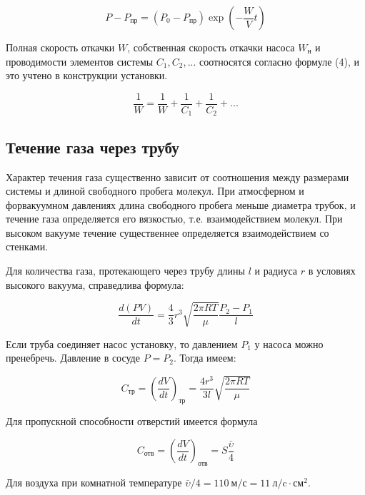\documentclass[a4paper,12pt]{article} %
\begin{document}
 \begin{equation}
 	P - P_{\text{пр}} = (P_0 - P_{\text{пр}})\exp(-\frac{W}{V}t)
 \end{equation}
 
\noindent Полная скорость откачки $W$, собственная скорость откачки насоса $W_{\text{н}}$ и проводимости элементов системы $C_1, C_2,...$ соотносятся согласно формуле (4), и это учтено в конструкции установки.

 \begin{equation}
 \frac{1}{W} = \frac{1}{W} + \frac{1}{C_1} + \frac{1}{C_2} + ...
\end{equation}

\subsection*{Течение газа через трубу}

\noindent Характер течения газа существенно зависит от соотношения между размерами системы и длиной свободного пробега молекул. При атмосферном и форвакуумном давлениях  длина свободного пробега меньше диаметра трубок, и течение газа определяется его вязкостью, т.е. взаимодействием молекул. При высоком вакууме течение существеннее определяется взаимодействием со стенками.

\medskip

\noindent Для количества газа, протекающего через трубу длины $l$ и радиуса $r$ в условиях высокого вакуума, справедлива формула:

\begin{equation}
	\frac{d(PV)}{dt} = \frac{4}{3}r^3\sqrt{\frac{2\pi RT}{\mu}}\frac{P_2 - P_1}{l}
\end{equation}

\noindent Если труба соединяет насос установку, то давлением $P_1$ у насоса можно пренебречь. Давление в сосуде $P = P_2$. Тогда имеем:

\begin{equation}
C_\text{тр} = \left(\frac{dV}{dt}\right)_\text{тр} = \frac{4r^3}{3l}\sqrt{\frac{2\pi RT}{\mu}}
\end{equation}

\noindent Для пропускной способности отверстий имеется формула

\begin{equation}
C_\text{отв} = \left(\frac{dV}{dt}\right)_\text{отв} = S\frac{\bar{\upsilon}}{4}
\end{equation}

\noindent Для воздуха при комнатной температуре $\bar{\upsilon}/4 = 110~\text{м/с} = 11~\text{л/c}\cdot\text{см}^2$.
\end{document}
